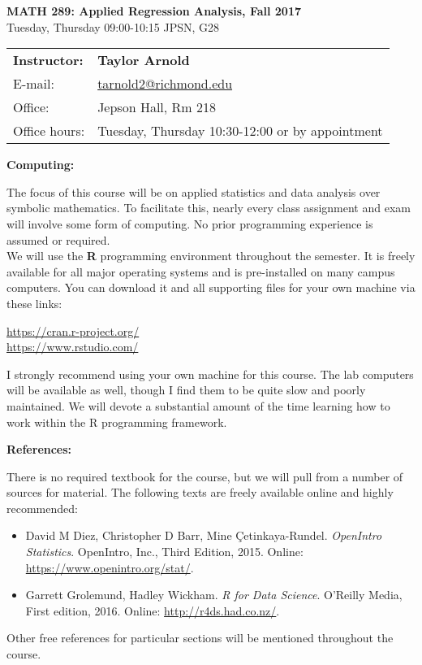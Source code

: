 \documentclass[12pt]{article}
\begin{document}
\begin{center}
{\bf MATH 289: Applied Regression Analysis, Fall 2017} \\
Tuesday, Thursday 09:00-10:15 \quad JPSN, G28\\
\end{center}

\bigskip

\noindent
\begin{tabular}{ l l }
{\bf Instructor:} &  {\bf Taylor Arnold} \\
E-mail: & \href{mailto:tarnold2@richmond.edu}{tarnold2@richmond.edu} \\
Office: & Jepson Hall, Rm 218 \\
Office hours: & Tuesday, Thursday 10:30-12:00 or by appointment
\end{tabular}

\vspace{0.5cm}

\textbf{Computing:} \vspace{6pt}

The focus of this course will be on applied statistics and data
analysis over symbolic mathematics. To facilitate this, nearly
every class assignment and exam will involve some form of
computing. No prior programming experience is assumed or
required. \\

We will use the \textbf{R} programming environment throughout the
semester. It is freely available for all major operating systems and
is pre-installed on many campus computers. You can download it and
all supporting files for your own machine via these links:
\begin{center}
\url{https://cran.r-project.org/} \\
\url{https://www.rstudio.com/}
\end{center}
I strongly recommend using your own machine for this course. The
lab computers will be available as well, though I find them to be
quite slow and poorly maintained. We will devote a substantial
amount of the time learning how to work within the R programming
framework.

\vspace{0.4cm}

\textbf{References:} \vspace{6pt}

There is no required textbook for the course, but we will pull
from a number of sources for material. The following texts are
freely available online and highly recommended:
\begin{itemize}\setlength\itemsep{0em}
\item David M Diez, Christopher D Barr, Mine Çetinkaya-Rundel.
  \textit{OpenIntro Statistics}. OpenIntro, Inc., Third Edition,
  2015. Online: \url{https://www.openintro.org/stat/}.
\item Garrett Grolemund, Hadley Wickham. \textit{R for Data Science}.
  O'Reilly Media, First edition, 2016. Online: \url{http://r4ds.had.co.nz/}.
\end{itemize}
Other free references for particular sections will be mentioned
throughout the course.
\end{document}
